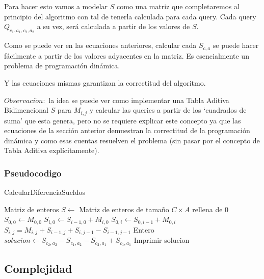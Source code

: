 Para hacer esto vamos a modelar $S$ como una matriz que completaremos al principio del 
algoritmo con tal de tenerla calculada para cada query. Cada query $Q_{c_1,a_1,c_2,a_2}$ a su vez, será calculada
a partir de los valores de $S$.

Como se puede ver en las ecuaciones anteriores, calcular cada $S_{c,a}$ se puede hacer fácilmente a partir de los valores adyacentes
en la matriz. Es esencialmente un problema de programación dinámica.

Y las ecuaciones mismas garantizan la correctitud del algoritmo.

$Observaci\acute{o}n: $ la idea se puede ver como implementar una Tabla Aditiva Bidimencional $S$ para $M_{i,j}$ y calcular las queries a partir de los `cuadrados de suma' que esta genera, pero no se requiere explicar este concepto ya que las ecuaciones
de la sección anterior demuestran la correctitud de la programación dinámica y como esas cuentas resuelven el problema (sin pasar
por el concepto de Tabla Aditiva explícitamente).

\subsubsection*{Pseudocodigo}

\begin{algorithm}[H]
    \caption{CalcularDiferenciaSueldos}
    Matriz de enteros $S \gets$ Matriz de enteros de tamaño $C \times A$ rellena de 0 \;
    $S_{0,0} \gets M_{0,0}$ \;
     {
    	$S_{i, 0} \gets S_{i-1, 0} + M_{i, 0}$
    }
     {
    	$S_{0, i} \gets S_{0, i-1} + M_{0, i}$
    }
     {
         {
            $S_{i,j} = M_{i,j} + S_{i-1,j} + S_{i,j-1} - S_{i-1,j-1}$
        }
    }
     {
    	Entero $solucion \gets S_{c_2,a_2} - S_{c_1,a_2} - S_{c_2,a_1} + S_{c_1,a_1}$ \;
        Imprimir solucion
    }
\end{algorithm}

\subsection{Complejidad}

